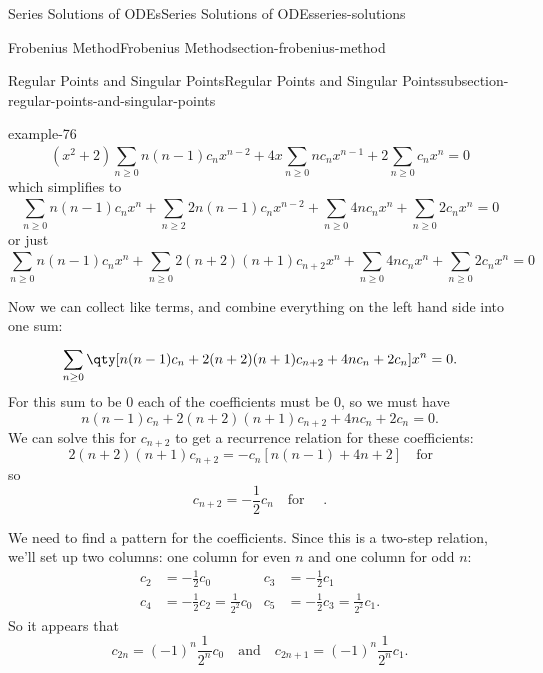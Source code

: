 \documentclass[oneside,10pt,]{book}
\numberwithin{equation}{section}
\newcommand{\qq}[1]{\quad\text{#1}\quad}
\newcommand{\amp}{&}
\begin{document}
\begin{chapterptx}{Series Solutions of ODEs}{}{Series Solutions of ODEs}{}{}{series-solutions}
\begin{sectionptx}{Frobenius Method}{}{Frobenius Method}{}{}{section-frobenius-method}
\begin{subsectionptx}{Regular Points and Singular Points}{}{Regular Points and Singular Points}{}{}{subsection-regular-points-and-singular-points}
\begin{example}{}{example-76}
\begin{equation*}
(x^{2}+2)\sum_{n\geq0}^{}n(n-1)c_{n}x^{n-2}+4x\sum_{n\geq0}^{}nc_{n}x^{n-1}+2\sum_{n\geq0}^{}c_{n}x^{n} = 0
\end{equation*}
which simplifies to%
\begin{equation*}
\sum_{n\geq0}^{}n(n-1)c_{n}x^{n}+\sum_{n\geq2}^{}2n(n-1)c_{n}x^{n-2}+\sum_{n\geq0}^{}4nc_{n}x^{n}+\sum_{n\geq0}^{}2c_{n}x^{n} = 0
\end{equation*}
or just%
\begin{equation*}
\sum_{n\geq0}^{}n(n-1)c_{n}x^{n}+\sum_{n\geq0}^{}2(n+2)(n+1)c_{n+2}x^{n}+\sum_{n\geq0}^{}4nc_{n}x^{n}+\sum_{n\geq0}^{}2c_{n}x^{n} = 0
\end{equation*}
%
\par
\hypertarget{p-467}{}%
Now we can collect like terms, and combine everything on the left hand side into one sum:%
\begin{equation*}
\sum_{n\geq0}^{}\qty[n(n-1)c_{n}+2(n+2)(n+1)c_{n+2}+4nc_{n}+2c_{n}]x^{n} = 0.
\end{equation*}
For this sum to be \(0\) each of the coefficients must be \(0\), so we must have%
\begin{equation*}
n(n-1)c_{n}+2(n+2)(n+1)c_{n+2}+4nc_{n}+2c_{n} = 0.
\end{equation*}
We can solve this for \(c_{n+2}\) to get a recurrence relation for these coefficients:%
\begin{equation*}
2(n+2)(n+1)c_{n+2} = -c_{n}[n(n-1)+4n+2] \qq{for }
\end{equation*}
so%
\begin{equation*}
c_{n+2} = -\frac{1}{2}c_{n}\qq{for }.
\end{equation*}
%
\par
\hypertarget{p-468}{}%
We need to find a pattern for the coefficients. Since this is a two-step relation, we'll set up two columns: one column for even \(n\) and one column for odd \(n\):%
\begin{align*}
c_{2} \amp= -\frac{1}{2}c_{0} \amp c_{3} \amp= -\frac{1}{2}c_{1}\\
c_{4} \amp= -\frac{1}{2}c_{2} = \frac{1}{2^{2}}c_{0} \amp c_{5} \amp= -\frac{1}{2}c_{3} = \frac{1}{2^{2}}c_{1}\text{.}
\end{align*}
So it appears that%
\begin{equation*}
c_{2n} = (-1)^{n}\frac{1}{2^{n}}c_{0}\qq{and}c_{2n+1} = (-1)^{n}\frac{1}{2^{n}}c_{1}\text{.}
\end{equation*}
%
\par
\hypertarget{p-469}{}%

\end{example}
\end{subsectionptx}
\end{sectionptx}
\end{chapterptx}
\end{document}
